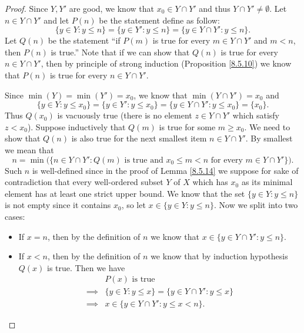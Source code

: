 \begin{proof}
    Since \(Y, Y'\) are good, we know that \(x_0 \in Y \cap Y'\) and thus \(Y \cap Y' \neq \emptyset\).
    Let \(n \in Y \cap Y'\) and let \(P(n)\) be the statement define as follow:
    \[
        \{y \in Y : y \leq n\} = \{y \in Y' : y \leq n\} = \{y \in Y \cap Y' : y \leq n\}.
    \]
    Let \(Q(n)\) be the statement ``if \(P(m)\) is true for every \(m \in Y \cap Y'\) and \(m < n\), then \(P(n)\) is true.''
    Note that if we can show that \(Q(n)\) is true for every \(n \in Y \cap Y'\), then by principle of strong induction (Proposition \ref{8.5.10}) we know that \(P(n)\) is true for every \(n \in Y \cap Y'\).

    Since \(\min(Y) = \min(Y') = x_0\), we know that \(\min(Y \cap Y') = x_0\) and
    \[
        \{y \in Y : y \leq x_0\} = \{y \in Y' : y \leq x_0\} = \{y \in Y \cap Y' : y \leq x_0\} = \{x_0\}.
    \]
    Thus \(Q(x_0)\) is vacuously true (there is no element \(z \in Y \cap Y'\) which satisfy \(z < x_0\)).
    Suppose inductively that \(Q(m)\) is true for some \(m \geq x_0\).
    We need to show that \(Q(n)\) is also true for the next smallest item \(n \in Y \cap Y'\).
    By smallest we mean that
    \[
        n = \min\big(\{n \in Y \cap Y' : Q(m) \text{ is true and } x_0 \leq m < n \text { for every } m \in Y \cap Y'\}\big).
    \]
    Such \(n\) is well-defined since in the proof of Lemma \ref{8.5.14} we suppose for sake of contradiction that every well-ordered subset \(Y\) of \(X\) which has \(x_0\) as its minimal element has at least one strict upper bound.
    We know that the set \(\{y \in Y : y \leq n\}\) is not empty since it contains \(x_0\), so let \(x \in \{y \in Y : y \leq n\}\).
    Now we split into two cases:
    \begin{itemize}
        \item If \(x = n\), then by the definition of \(n\) we know that \(x \in \{y \in Y \cap Y' : y \leq n\}\).
        \item If \(x < n\), then by the definition of \(n\) we know that by induction hypothesis \(Q(x)\) is true.
              Then we have
              \begin{align*}
                           & P(x) \text{ is true}                                    \\
                  \implies & \{y \in Y : y \leq x\} = \{y \in Y \cap Y' : y \leq x\} \\
                  \implies & x \in \{y \in Y \cap Y' : y \leq x < n\}.
              \end{align*}

\end{itemize}
\end{proof}
